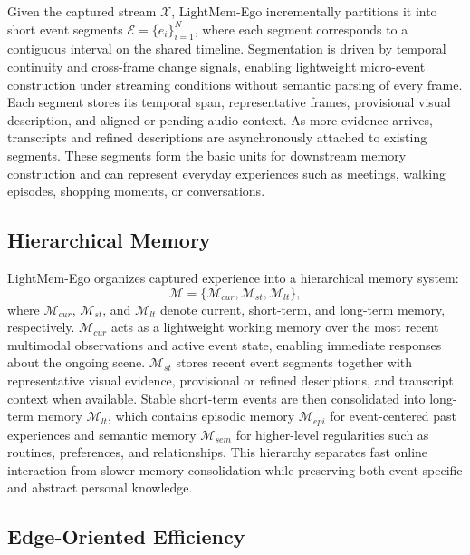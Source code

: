 Given the captured stream \(\mathcal{X}\), LightMem-Ego incrementally partitions it into short event segments 
\(\mathcal{E}=\{e_i\}_{i=1}^{N}\), where each segment corresponds to a contiguous interval on the shared timeline. 
Segmentation is driven by temporal continuity and cross-frame change signals, enabling lightweight micro-event construction under streaming conditions without semantic parsing of every frame. 
Each segment stores its temporal span, representative frames, provisional visual description, and aligned or pending audio context. 
As more evidence arrives, transcripts and refined descriptions are asynchronously attached to existing segments. 
These segments form the basic units for downstream memory construction and can represent everyday experiences such as meetings, walking episodes, shopping moments, or conversations.

\subsection{Hierarchical Memory}

LightMem-Ego organizes captured experience into a hierarchical memory system:
\begin{equation}
\mathcal{M}=\{\mathcal{M}_{cur},\mathcal{M}_{st},\mathcal{M}_{lt}\},
\end{equation}
where \(\mathcal{M}_{cur}\), \(\mathcal{M}_{st}\), and \(\mathcal{M}_{lt}\) denote current, short-term, and long-term memory, respectively. 
\(\mathcal{M}_{cur}\) acts as a lightweight working memory over the most recent multimodal observations and active event state, enabling immediate responses about the ongoing scene. 
\(\mathcal{M}_{st}\) stores recent event segments together with representative visual evidence, provisional or refined descriptions, and transcript context when available. 
Stable short-term events are then consolidated into long-term memory \(\mathcal{M}_{lt}\), which contains episodic memory \(\mathcal{M}_{epi}\) for event-centered past experiences and semantic memory \(\mathcal{M}_{sem}\) for higher-level regularities such as routines, preferences, and relationships. 
This hierarchy separates fast online interaction from slower memory consolidation while preserving both event-specific and abstract personal knowledge.

\subsection{Edge-Oriented Efficiency}


